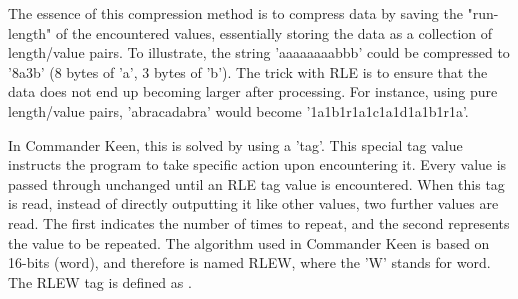 \documentclass[book.tex]{subfiles}
\begin{document}
\par
The essence of this compression method is to compress data by saving the "run-length" of the encountered values, essentially storing the data as a collection of length/value pairs. To illustrate, the string 'aaaaaaaabbb' could be compressed to '8a3b' (8 bytes of 'a', 3 bytes of 'b'). The trick with RLE is to ensure that the data does not end up becoming larger after processing. For instance, using pure length/value pairs, 'abracadabra' would become '1a1b1r1a1c1a1d1a1b1r1a'.\\

\par
In Commander Keen, this is solved by using a 'tag'. This special tag value instructs the program to take specific action upon encountering it. Every value is passed through unchanged until an RLE tag value is encountered. When this tag is read, instead of directly outputting it like other values, two further values are read. The first indicates the number of times to repeat, and the second represents the value to be repeated. The algorithm used in Commander Keen is based on 16-bits (word), and therefore is named RLEW, where the 'W' stands for word. The RLEW tag is defined as .\\


\par
\begin{minipage}{\textwidth}
 \par
 \end{minipage}\\
 
 
\end{document}
